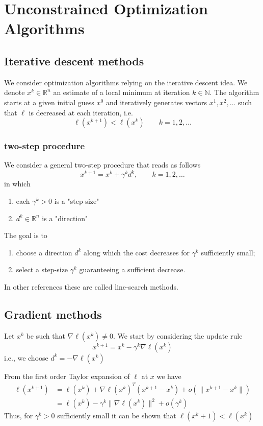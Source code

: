 \documentclass[openany]{book}
\newcommand{\R}{\mathbb{R}} %
\newcommand{\N}{\mathbb{N}} %
\theoremstyle{definition}
\theoremstyle{remark}
\begin{document}
\section{Unconstrained Optimization Algorithms}
\subsection{Iterative descent methods}
We consider optimization algorithms relying on the iterative descent idea. We denote $x^k\in\R^n$ an estimate of a local minimum at iteration $k\in\N$. The algorithm starts at a given initial guess $x^0$ and iteratively generates vectors $x^1,x^2,\dots$ such that $\ell$ is decreased at each iteration, i.e. 
\[
    \ell(x^{k+1})<\ell(x^k) \qquad k = 1,2,\dots
\]
\subsubsection{two-step procedure}
We consider a general two-step procedure that reads as follows 
\[
    x^{k+1} = x^k+\gamma^k d^k, \qquad k=1,2,\dots
\]
in which 
\begin{enumerate}
    \item each $\gamma^k>0$ is a "step-size" 
    \item $d^k\in\R^n$ is a "direction"
\end{enumerate}
The goal is to 
\begin{enumerate}
    \item choose a direction $d^k$ along which the cost decreases for $\gamma^k$ sufficiently small;
    \item select a step-size $\gamma^k$ guaranteeing a sufficient decrease. 
\end{enumerate}
In other references these are called line-search methods.
\subsection{Gradient methods}
Let $x^k$ be such that $\nabla\ell(x^k)\neq 0$. We start by considering the update rule 
\[
    x^{k+1} = x^k-\gamma^k\nabla\ell(x^k)
\]
i.e., we choose $d^k = -\nabla\ell(x^k)$

From the first order Taylor expansion of $\ell$ at $x$ we have 
\begin{align*}
    \ell(x^{k+1}) & =  \ell(x^k)+\nabla\ell(x^k)^T(x^{k+1}-x^k)+o(\|x^{k+1}-x^k\|)\\
    & =  \ell(x^k)-\gamma^k\|\nabla\ell(x^k)\|^2+o(\gamma^k)
\end{align*}
Thus, for $\gamma^k>0$ sufficiently small it can be shown that $\ell(x^k+1)<\ell(x^k)$
\end{document}
